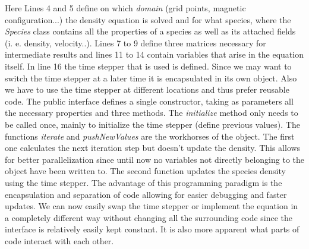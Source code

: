 Here Lines 4 and 5 define on which \textit{domain} (grid points, magnetic configuration...) the density equation is solved and for what species, where the \textit{Species} class contains all the properties of a species as well as its attached fields (i. e. density, velocity..).\newline
Lines 7 to 9 define three matrices necessary for intermediate results and lines 11 to 14 contain variables that arise in the equation itself.  In line 16 the time stepper that is used is defined. Since we may want to switch the time stepper at a later time it is encapsulated in its own object. Also we have to use the time stepper at different locations and thus prefer reusable code.\newline
The public interface defines a single constructor, taking as parameters all the necessary properties and three methods. The \textit{initialize} method only needs to be called once, mainly to initialize the time stepper (define previous values).
The functions \textit{iterate} and \textit{pushNewValues} are the workhorses of the object. The first one calculates the next iteration step but doesn't update the density. This allows for better parallelization since until now no variables not directly belonging to the object have been written to. The second function updates the species density using the time stepper.\newline
The advantage of this programming paradigm is the encapsulation and separation of code allowing for easier debugging and faster updates. We can now easily swap the time stepper or implement the equation in a completely different way without changing all the surrounding code since the interface is relatively easily kept constant. It is also more apparent what parts of code interact with each other.

